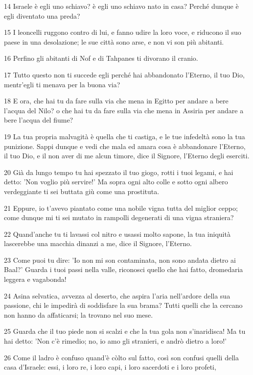 \par 14 Israele è egli uno schiavo? è egli uno schiavo nato in casa? Perché dunque è egli diventato una preda?
\par 15 I leoncelli ruggono contro di lui, e fanno udire la loro voce, e riducono il suo paese in una desolazione; le sue città sono arse, e non vi son più abitanti.
\par 16 Perfino gli abitanti di Nof e di Tahpanes ti divorano il cranio.
\par 17 Tutto questo non ti succede egli perché hai abbandonato l'Eterno, il tuo Dio, mentr'egli ti menava per la buona via?
\par 18 E ora, che hai tu da fare sulla via che mena in Egitto per andare a bere l'acqua del Nilo? o che hai tu da fare sulla via che mena in Assiria per andare a bere l'acqua del fiume?
\par 19 La tua propria malvagità è quella che ti castiga, e le tue infedeltà sono la tua punizione. Sappi dunque e vedi che mala ed amara cosa è abbandonare l'Eterno, il tuo Dio, e il non aver di me alcun timore, dice il Signore, l'Eterno degli eserciti.
\par 20 Già da lungo tempo tu hai spezzato il tuo giogo, rotti i tuoi legami, e hai detto: 'Non voglio più servire!' Ma sopra ogni alto colle e sotto ogni albero verdeggiante ti sei buttata giù come una prostituta.
\par 21 Eppure, io t'avevo piantato come una nobile vigna tutta del miglior ceppo; come dunque mi ti sei mutato in rampolli degenerati di una vigna straniera?
\par 22 Quand'anche tu ti lavassi col nitro e usassi molto sapone, la tua iniquità lascerebbe una macchia dinanzi a me, dice il Signore, l'Eterno.
\par 23 Come puoi tu dire: 'Io non mi son contaminata, non sono andata dietro ai Baal?' Guarda i tuoi passi nella valle, riconosci quello che hai fatto, dromedaria leggera e vagabonda!
\par 24 Asina selvatica, avvezza al deserto, che aspira l'aria nell'ardore della sua passione, chi le impedirà di soddisfare la sua brama? Tutti quelli che la cercano non hanno da affaticarsi; la trovano nel suo mese.
\par 25 Guarda che il tuo piede non si scalzi e che la tua gola non s'inaridisca! Ma tu hai detto: 'Non c'è rimedio; no, io amo gli stranieri, e andrò dietro a loro!'
\par 26 Come il ladro è confuso quand'è còlto sul fatto, così son confusi quelli della casa d'Israele: essi, i loro re, i loro capi, i loro sacerdoti e i loro profeti,
